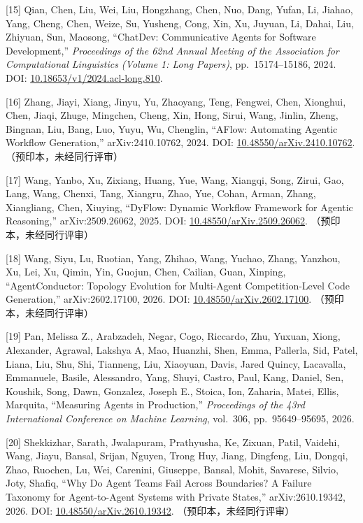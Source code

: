 \documentclass[
]{article}
\begin{document}
{[}15{]} Qian, Chen, Liu, Wei, Liu, Hongzhang, Chen, Nuo, Dang, Yufan,
Li, Jiahao, Yang, Cheng, Chen, Weize, Su, Yusheng, Cong, Xin, Xu,
Juyuan, Li, Dahai, Liu, Zhiyuan, Sun, Maosong, ``ChatDev: Communicative
Agents for Software Development,'' \emph{Proceedings of the 62nd Annual
Meeting of the Association for Computational Linguistics (Volume 1: Long
Papers)}, pp.~15174--15186, 2024. DOI:
\href{https://doi.org/10.18653/v1/2024.acl-long.810}{10.18653/v1/2024.acl-long.810}.

{[}16{]} Zhang, Jiayi, Xiang, Jinyu, Yu, Zhaoyang, Teng, Fengwei, Chen,
Xionghui, Chen, Jiaqi, Zhuge, Mingchen, Cheng, Xin, Hong, Sirui, Wang,
Jinlin, Zheng, Bingnan, Liu, Bang, Luo, Yuyu, Wu, Chenglin, ``AFlow:
Automating Agentic Workflow Generation,'' arXiv:2410.10762, 2024. DOI:
\href{https://doi.org/10.48550/arXiv.2410.10762}{10.48550/arXiv.2410.10762}.
（预印本，未经同行评审）

{[}17{]} Wang, Yanbo, Xu, Zixiang, Huang, Yue, Wang, Xiangqi, Song,
Zirui, Gao, Lang, Wang, Chenxi, Tang, Xiangru, Zhao, Yue, Cohan, Arman,
Zhang, Xiangliang, Chen, Xiuying, ``DyFlow: Dynamic Workflow Framework
for Agentic Reasoning,'' arXiv:2509.26062, 2025. DOI:
\href{https://doi.org/10.48550/arXiv.2509.26062}{10.48550/arXiv.2509.26062}.
（预印本，未经同行评审）

{[}18{]} Wang, Siyu, Lu, Ruotian, Yang, Zhihao, Wang, Yuchao, Zhang,
Yanzhou, Xu, Lei, Xu, Qimin, Yin, Guojun, Chen, Cailian, Guan, Xinping,
``AgentConductor: Topology Evolution for Multi-Agent Competition-Level
Code Generation,'' arXiv:2602.17100, 2026. DOI:
\href{https://doi.org/10.48550/arXiv.2602.17100}{10.48550/arXiv.2602.17100}.
（预印本，未经同行评审）

{[}19{]} Pan, Melissa Z., Arabzadeh, Negar, Cogo, Riccardo, Zhu, Yuxuan,
Xiong, Alexander, Agrawal, Lakshya A, Mao, Huanzhi, Shen, Emma,
Pallerla, Sid, Patel, Liana, Liu, Shu, Shi, Tianneng, Liu, Xiaoyuan,
Davis, Jared Quincy, Lacavalla, Emmanuele, Basile, Alessandro, Yang,
Shuyi, Castro, Paul, Kang, Daniel, Sen, Koushik, Song, Dawn, Gonzalez,
Joseph E., Stoica, Ion, Zaharia, Matei, Ellis, Marquita, ``Measuring
Agents in Production,'' \emph{Proceedings of the 43rd International
Conference on Machine Learning}, vol.~306, pp.~95649--95695, 2026.

{[}20{]} Shekkizhar, Sarath, Jwalapuram, Prathyusha, Ke, Zixuan, Patil,
Vaidehi, Wang, Jiayu, Bansal, Srijan, Nguyen, Trong Huy, Jiang,
Dingfeng, Liu, Dongqi, Zhao, Ruochen, Lu, Wei, Carenini, Giuseppe,
Bansal, Mohit, Savarese, Silvio, Joty, Shafiq, ``Why Do Agent Teams Fail
Across Boundaries? A Failure Taxonomy for Agent-to-Agent Systems with
Private States,'' arXiv:2610.19342, 2026. DOI:
\href{https://doi.org/10.48550/arXiv.2610.19342}{10.48550/arXiv.2610.19342}.
（预印本，未经同行评审）
\end{document}
